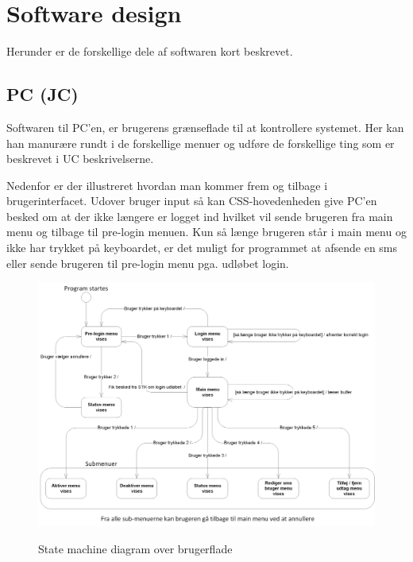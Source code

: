\clearpage

\section{Software design}

Herunder er de forskellige dele af softwaren kort beskrevet. 

\subsection{PC (JC)}

Softwaren til PC'en, er brugerens grænseflade til at kontrollere systemet. Her kan han manurære rundt i de forskellige menuer og udføre de forskellige ting som er beskrevet i UC beskrivelserne.

Nedenfor er der illustreret hvordan man kommer frem og tilbage i brugerinterfacet. Udover bruger input så kan CSS-hovedenheden give PC'en besked om at der ikke længere er logget ind hvilket vil sende brugeren fra main menu og tilbage til pre-login menuen. Kun så længe brugeren står i main menu og ikke har trykket på keyboardet, er det muligt for programmet at afsende en sms eller sende brugeren til pre-login menu pga. udløbet login.

\begin{figure}[htbp] \centering
{\includegraphics[width=\textwidth]{billeder/uml/state_machine_main}}
\caption{State machine diagram over brugerflade}
\label{fig:State machine diagram over brugerflade}
\end{figure}



